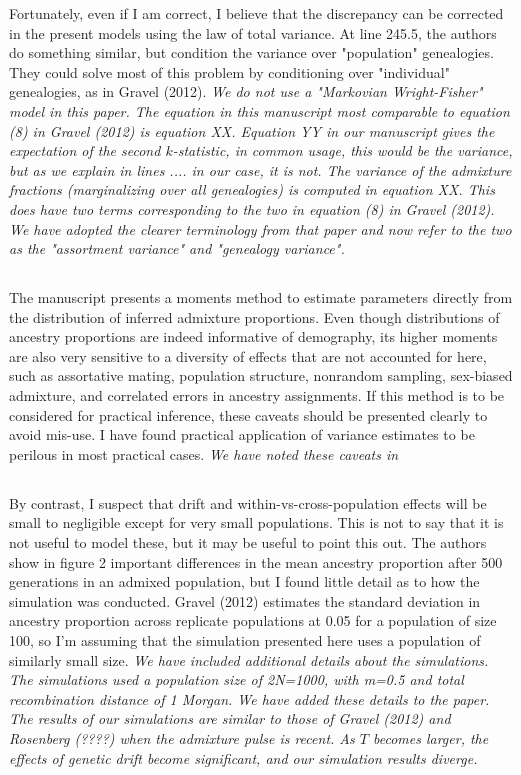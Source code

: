\documentclass[11pt]{amsart}
\begin{document}
Fortunately, even if I am correct, I believe that the discrepancy can be corrected in the present models
using the law of total variance. At line 245.5, the authors do something similar, but condition the variance
over "population" genealogies. They could solve most of this problem by conditioning over "individual"
genealogies, as in Gravel (2012).
\textit{
	We do not use a "Markovian Wright-Fisher" model in this paper.
	The equation in this manuscript most comparable to equation (8) in Gravel (2012) is equation XX.
	Equation YY in our manuscript gives the expectation of the second $k$-statistic,
	in common usage, this would be the variance, but as we explain in lines .... in our case, it is not.
	The variance of the admixture fractions (marginalizing over all genealogies) is computed in equation XX.
	This does have two terms corresponding to the two in  equation (8) in Gravel (2012).
	We have adopted the clearer terminology from that paper and now refer to the two as the "assortment variance" 
	and "genealogy variance". 
}

\subsection{}
The manuscript presents a moments method to estimate parameters directly from the distribution of
inferred admixture proportions. Even though distributions of ancestry proportions are indeed informative
of demography, its higher moments are also very sensitive to a diversity of effects that are not accounted
for here, such as assortative mating, population structure, nonrandom sampling, sex-biased admixture,
and correlated errors in ancestry assignments. If this method is to be considered for practical inference,
these caveats should be presented clearly to avoid mis-use. I have found practical application of variance
estimates to be perilous in most practical cases.
\textit{
	We have noted these caveats in 
}

\subsection{}
By contrast, I suspect that drift and within-vs-cross-population effects will be small to negligible except
for very small populations. This is not to say that it is not useful to model these, but it may be useful to
point this out. The authors show in figure 2 important differences in the mean ancestry proportion after
500 generations in an admixed population, but I found little detail as to how the simulation was
conducted. Gravel (2012) estimates the standard deviation in ancestry proportion across replicate
populations at 0.05 for a population of size 100, so I'm assuming that the simulation presented here uses
a population of similarly small size.
\textit{
	We have included additional details about the simulations.
	The simulations used a population size of 2N=1000, with m=0.5 and total recombination distance of 1 Morgan.
	We have added these details to the paper. 
	The results of our simulations are similar to those of Gravel (2012) and Rosenberg (????) when the admixture 
	pulse is recent. 
	As $T$ becomes larger, the effects of genetic drift become significant, and our simulation results diverge. 
}
\end{document}

